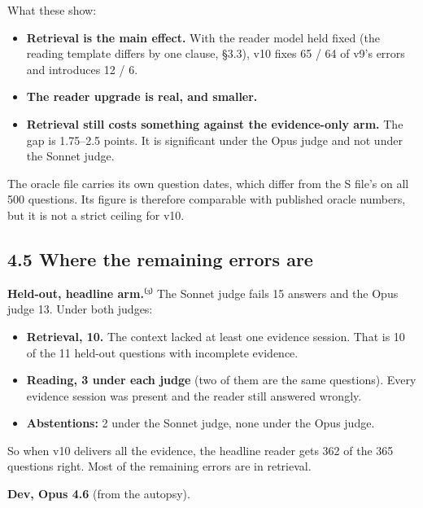 \documentclass[11pt]{article}
\providecommand{\tightlist}{\setlength{\itemsep}{0pt}\setlength{\parskip}{0pt}}
\begin{document}
What these show:

\begin{itemize}
\tightlist
\item
  \textbf{Retrieval is the main effect.} With the reader model held fixed (the reading template differs by one
  clause, §3.3), v10 fixes 65 / 64 of v9's errors and introduces 12 / 6.
\item
  \textbf{The reader upgrade is real, and smaller.}
\item
  \textbf{Retrieval still costs something against the evidence-only arm.} The gap is 1.75--2.5 points. It is
  significant under the Opus judge and not under the Sonnet judge.
\end{itemize}

The oracle file carries its own question dates, which differ from the S file's on all 500 questions. Its
figure is therefore comparable with published oracle numbers, but it is not a strict ceiling for v10.

\hypertarget{where-the-remaining-errors-are}{%
\subsection{4.5 Where the remaining errors are}\label{where-the-remaining-errors-are}}

\textbf{Held-out, headline arm.}⁽³⁾ The Sonnet judge fails 15 answers and the Opus judge 13. Under both judges:

\begin{itemize}
\tightlist
\item
  \textbf{Retrieval, 10.} The context lacked at least one evidence session. That is 10 of the 11 held-out
  questions with incomplete evidence.
\item
  \textbf{Reading, 3 under each judge} (two of them are the same questions). Every evidence session was present
  and the reader still answered wrongly.
\item
  \textbf{Abstentions:} 2 under the Sonnet judge, none under the Opus judge.
\end{itemize}

So when v10 delivers all the evidence, the headline reader gets 362 of the 365 questions right. Most of the
remaining errors are in retrieval.

\textbf{Dev, Opus 4.6} (from the autopsy).
\end{document}

